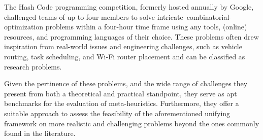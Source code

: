 The Hash Code programming competition, formerly hosted annually by Google,
challenged teams of up to four members to solve
intricate~\acrshort{combinatorial-optimization} problems within a four-hour time
frame using any tools, (online) resources, and programming languages of their
choice. These problems often drew inspiration from real-world issues and
engineering challenges, such as vehicle routing, task scheduling, and Wi-Fi
router placement and can be classified as~ research problems.

Given the pertinence of these problems, and the wide range of challenges they
present from both a theoretical and practical standpoint, they serve as apt
benchmarks for the evaluation of meta-heuristics. Furthermore, they offer a
suitable approach to assess the feasibility of the aforementioned unifying
framework on more realistic and challenging problems beyond the ones commonly
found in the literature.